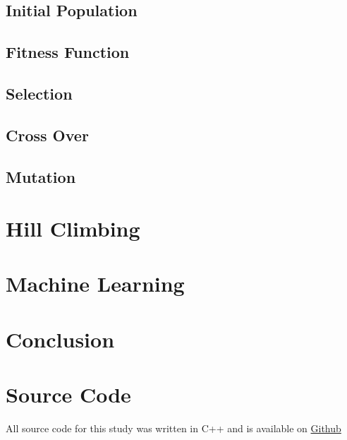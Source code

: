 \documentclass[12pt]{article}
\begin{document}
\subsection{Initial Population}
\subsection{Fitness Function}
\subsection{Selection}
\subsection{Cross Over}
\subsection{Mutation}



\pagebreak

\section{Hill Climbing}

\pagebreak

\section{Machine Learning}

\pagebreak

\section{Conclusion}

\pagebreak

\section{Source Code}
All source code for this study was written in C++ and is
available on
\href{https://github.com/Quinny/IteratedPrisoners}{Github}
\end{document}

